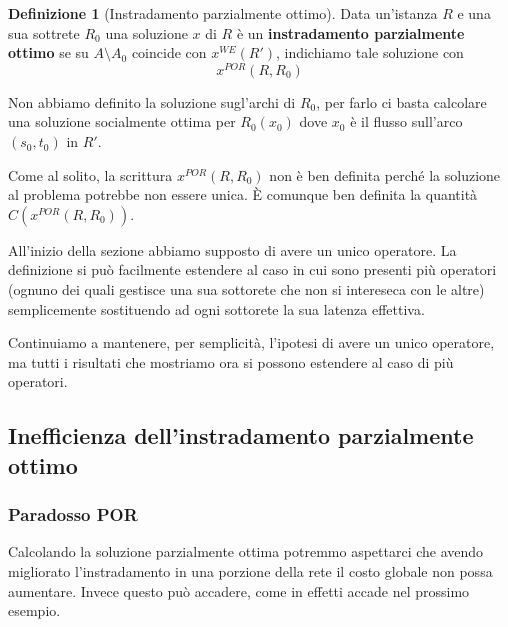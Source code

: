 \documentclass[a4paper]{article}
\theoremstyle{plain}
\theoremstyle{definition}
\newtheorem{mydef}[myteo]{Definizione}
\theoremstyle{remark}
\newcommand{\pa}[1]{\left(#1\right)}
\begin{document}
\begin{mydef}[Instradamento parzialmente ottimo]
  Data un'istanza $R$ e una sua sottrete $R_0$ una soluzione $x$ di
  $R$ è un \textbf{instradamento parzialmente ottimo} se su
  $A\setminus A_0$ coincide con $x^{WE}(R')$, indichiamo tale
  soluzione con
  \[ x^{POR}(R,R_0) \]
\end{mydef}

Non abbiamo definito la soluzione sugl'archi di $R_0$, per farlo ci
basta calcolare una soluzione socialmente ottima per $R_0\pa{x_0}$
dove $x_0$ è il flusso sull'arco $\pa{s_0,t_0}$ in $R'$.

Come al solito, la scrittura $x^{POR}\pa{R,R_0}$ non è ben definita
perché la soluzione al problema potrebbe non essere unica. È comunque
ben definita la quantità $C\pa{x^{POR}\pa{R,R_0}}$.

All'inizio della sezione abbiamo supposto di avere un unico operatore.
La definizione si può facilmente estendere al caso in cui sono
presenti più operatori (ognuno dei quali gestisce una sua sottorete
che non si intereseca con le altre) semplicemente sostituendo ad ogni
sottorete la sua latenza effettiva.

Continuiamo a mantenere, per semplicità, l'ipotesi di avere un unico
operatore, ma tutti i risultati che mostriamo ora si possono estendere
al caso di più operatori.

\subsection{Inefficienza dell'instradamento parzialmente ottimo}
\label{sec:inefficienza-por}

\subsubsection{Paradosso POR}
\label{sec:paradosso-por}

Calcolando la soluzione parzialmente ottima potremmo aspettarci che
avendo migliorato l'instradamento in una porzione della rete il costo
globale non possa aumentare. Invece questo può accadere, come in
effetti accade nel prossimo esempio.
\end{document}
